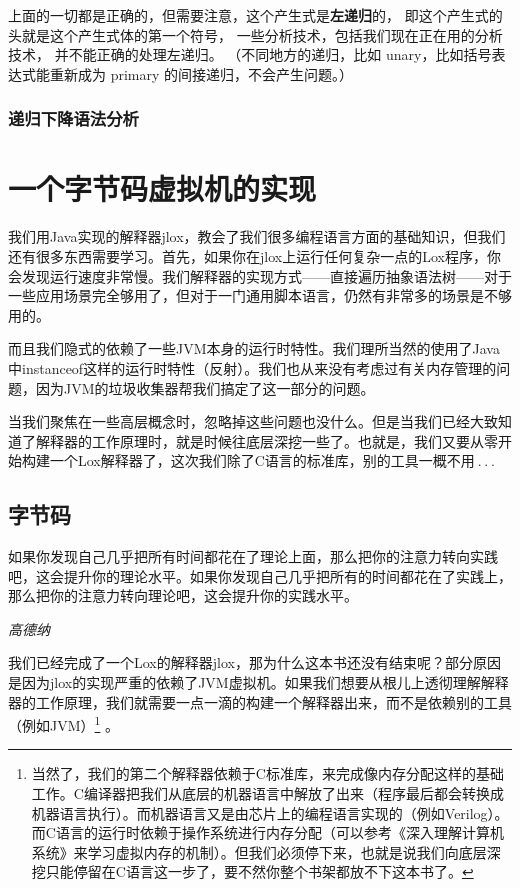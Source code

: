 \documentclass[cn,10pt,math=newtx,citestyle=gb7714-2015,bibstyle=gb7714-2015]{elegantbook}
\begin{document}
上面的一切都是正确的，但需要注意，这个产生式是\textbf{左递归}的， 即这个产生式的头就是这个产生式体的第一个符号， 一些分析技术，包括我们现在正在用的分析技术， 并不能正确的处理左递归。 （不同地方的递归，比如 unary，比如括号表达式能重新成为 primary 的间接递归，不会产生问题。）

\section{递归下降语法分析}

\part{一个字节码虚拟机的实现}

我们用Java实现的解释器jlox，教会了我们很多编程语言方面的基础知识，但我们还有很多东西需要学习。首先，如果你在jlox上运行任何复杂一点的Lox程序，你会发现运行速度非常慢。我们解释器的实现方式——直接遍历抽象语法树——对于一些应用场景完全够用了，但对于一门通用脚本语言，仍然有非常多的场景是不够用的。

而且我们隐式的依赖了一些JVM本身的运行时特性。我们理所当然的使用了Java中instanceof这样的运行时特性（反射）。我们也从来没有考虑过有关内存管理的问题，因为JVM的垃圾收集器帮我们搞定了这一部分的问题。

当我们聚焦在一些高层概念时，忽略掉这些问题也没什么。但是当我们已经大致知道了解释器的工作原理时，就是时候往底层深挖一些了。也就是，我们又要从零开始构建一个Lox解释器了，这次我们除了C语言的标准库，别的工具一概不用 . . . 

\chapter{字节码}

\epigraph{如果你发现自己几乎把所有时间都花在了理论上面，那么把你的注意力转向实践吧，这会提升你的理论水平。如果你发现自己几乎把所有的时间都花在了实践上，那么把你的注意力转向理论吧，这会提升你的实践水平。}{\textit{高德纳}}

我们已经完成了一个Lox的解释器jlox，那为什么这本书还没有结束呢？部分原因是因为jlox的实现严重的依赖了JVM虚拟机。如果我们想要从根儿上透彻理解解释器的工作原理，我们就需要一点一滴的构建一个解释器出来，而不是依赖别的工具（例如JVM）\footnote{当然了，我们的第二个解释器依赖于C标准库，来完成像内存分配这样的基础工作。C编译器把我们从底层的机器语言中解放了出来（程序最后都会转换成机器语言执行）。而机器语言又是由芯片上的编程语言实现的（例如Verilog）。而C语言的运行时依赖于操作系统进行内存分配（可以参考《深入理解计算机系统》来学习虚拟内存的机制）。但我们必须停下来，也就是说我们向底层深挖只能停留在C语言这一步了，要不然你整个书架都放不下这本书了。} 。 
\end{document}
